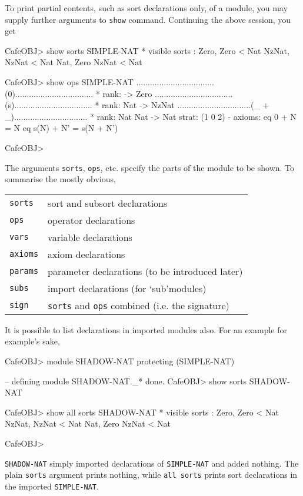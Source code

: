 \documentclass[a4paper]{memoir}
\begin{document}
To print partial contents, such as sort declarations only, of
a module, you may supply further arguments to \verb|show| command.
Continuing the above session, you get
\begin{vvtm}
\begin{ccode}
  CafeOBJ> show sorts SIMPLE-NAT
  * visible sorts :
    Zero, Zero < Nat
    NzNat, NzNat < Nat
    Nat, Zero NzNat < Nat

  CafeOBJ> show ops SIMPLE-NAT
  ..................................(0)..................................
    * rank: -> Zero
  ..................................(s)..................................
    * rank: Nat -> NzNat
  ................................(_ + _)................................
    * rank: Nat Nat -> Nat { strat: (1 0 2) }
      - axioms:
        eq 0 + N = N
        eq s(N) + N' = s(N + N')

  CafeOBJ>
\end{ccode}
\end{vvtm}
The arguments \verb|sorts|, \verb|ops|, etc. specify the parts of
the module to be shown. To summarise the mostly obvious,
\begin{center}
\begin{tabular}{ll}
 \verb|sorts| & sort and subsort declarations \\
 \verb|ops| & operator declarations \\
 \verb|vars| & variable declarations \\
 \verb|axioms| & axiom declarations \\
 \verb|params| & parameter declarations (to be introduced later) \\
 \verb|subs| & import declarations (for `sub'modules) \\
 \verb|sign| & \verb|sorts| and \verb|ops| combined (i.e. the signature) \\
\end{tabular}
\end{center}

It is possible to list declarations in imported modules also. For
an example for example's sake,
\begin{vvtm}
\begin{ccode}
  CafeOBJ> module SHADOW-NAT {
    protecting (SIMPLE-NAT)
  }

  -- defining module SHADOW-NAT._* done.
  CafeOBJ> show sorts SHADOW-NAT

  CafeOBJ> show all sorts SHADOW-NAT
  * visible sorts :
    Zero, Zero < Nat
    NzNat, NzNat < Nat
    Nat, Zero NzNat < Nat

  CafeOBJ> 
\end{ccode}
\end{vvtm}
\verb|SHADOW-NAT| simply imported declarations of \verb|SIMPLE-NAT|
and added nothing. The plain \verb|sorts| argument prints nothing,
while \verb|all sorts| prints sort declarations in the imported
\verb|SIMPLE-NAT|.
\end{document}
